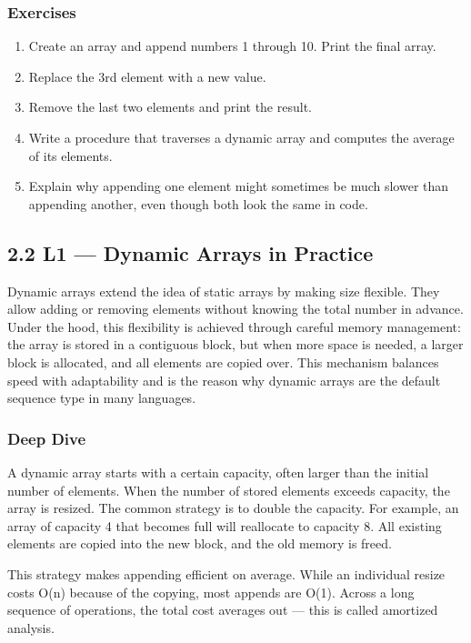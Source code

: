 \documentclass[
  letterpaper,
  DIV=11,
  numbers=noendperiod]{scrreprt}
\providecommand{\tightlist}{%
  \setlength{\itemsep}{0pt}\setlength{\parskip}{0pt}}
\begin{document}
\subsubsection{Exercises}\label{exercises-15}

\begin{enumerate}
\def\labelenumi{\arabic{enumi}.}
\tightlist
\item
  Create an array and append numbers 1 through 10. Print the final
  array.
\item
  Replace the 3rd element with a new value.
\item
  Remove the last two elements and print the result.
\item
  Write a procedure that traverses a dynamic array and computes the
  average of its elements.
\item
  Explain why appending one element might sometimes be much slower than
  appending another, even though both look the same in code.
\end{enumerate}

\subsection{2.2 L1 --- Dynamic Arrays in
Practice}\label{l1-dynamic-arrays-in-practice}

Dynamic arrays extend the idea of static arrays by making size flexible.
They allow adding or removing elements without knowing the total number
in advance. Under the hood, this flexibility is achieved through careful
memory management: the array is stored in a contiguous block, but when
more space is needed, a larger block is allocated, and all elements are
copied over. This mechanism balances speed with adaptability and is the
reason why dynamic arrays are the default sequence type in many
languages.

\subsubsection{Deep Dive}\label{deep-dive-7}

A dynamic array starts with a certain capacity, often larger than the
initial number of elements. When the number of stored elements exceeds
capacity, the array is resized. The common strategy is to double the
capacity. For example, an array of capacity 4 that becomes full will
reallocate to capacity 8. All existing elements are copied into the new
block, and the old memory is freed.

This strategy makes appending efficient on average. While an individual
resize costs O(n) because of the copying, most appends are O(1). Across
a long sequence of operations, the total cost averages out --- this is
called amortized analysis.
\end{document}
